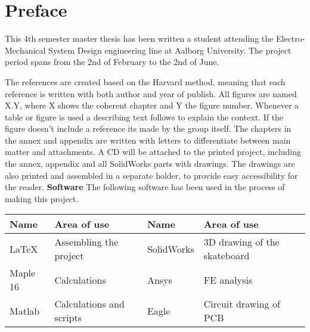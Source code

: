\chapter*{Preface}
This 4th semester master thesis has been written a student attending the Electro-Mechanical System Design engineering line at Aalborg University. The project period spans from the 2nd of February to the 2nd of June. \newline

\noindent The references are created based on the Harvard method, meaning that each reference is written with both author and year of publish. All figures are named X.Y, where X shows the coherent chapter and Y the figure number. Whenever a table or figure is used a describing text follows to explain the context. If the figure doesn't include a reference its made by the group itself. The chapters in the annex and appendix are written with letters to differentiate between main matter and attachments.\newline
\noindent A CD will be attached to the printed project, including the annex, appendix and all SolidWorks parts with drawings. The drawings are also printed and assembled in a separate holder, to provide easy accessibility for the reader.\newline
\textbf{Software}
The following software has been used in the process of making this project.

\begin{center}

\begin{tabular}{l l |l l}
\hline 
\textbf{Name} & \textbf{Area of use} & \textbf{Name} & \textbf{Area of use}\\ 
\hline  
\LaTeX & Assembling the project & SolidWorks & 3D drawing of the skateboard \\ 
\hline 
Maple 16 & Calculations & Ansys & FE analysis \\ 
\hline 
Matlab & Calculations and scripts & Eagle & Circuit drawing of PCB\\ 
\hline

\end{tabular} \\[2cm]

\end{center}

